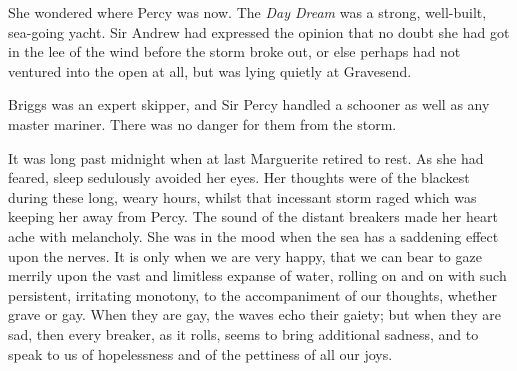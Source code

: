 She wondered where Percy was now. The \textit{Day Dream} was a strong, well-built, sea-going yacht. Sir Andrew had expressed the opinion that no doubt she had got in the lee of the wind before the storm broke out, or else perhaps had not ventured into the open at all, but was lying quietly at Gravesend.

Briggs was an expert skipper, and Sir Percy handled a schooner as well as any master mariner. There was no danger for them from the storm.

It was long past midnight when at last Marguerite retired to rest. As she had feared, sleep sedulously avoided her eyes. Her thoughts were of the blackest during these long, weary hours, whilst that incessant storm raged which was keeping her away from Percy. The sound of the distant breakers made her heart ache with melancholy. She was in the mood when the sea has a saddening effect upon the nerves. It is only when we are very happy, that we can bear to gaze merrily upon the vast and limitless expanse of water, rolling on and on with such persistent, irritating monotony, to the accompaniment of our thoughts, whether grave or gay. When they are gay, the waves echo their gaiety; but when they are sad, then every breaker, as it rolls, seems to bring additional sadness, and to speak to us of hopelessness and of the pettiness of all our joys.